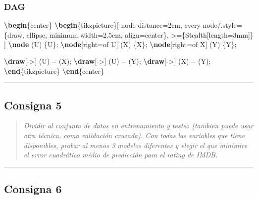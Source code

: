 \documentclass[
]{article}
\newenvironment{Shaded}{\begin{snugshade}}{\end{snugshade}}
\newcommand{\ExtensionTok}[1]{#1}
\newcommand{\FunctionTok}[1]{\textcolor[rgb]{0.13,0.29,0.53}{\textbf{#1}}}
\newcommand{\KeywordTok}[1]{\textcolor[rgb]{0.13,0.29,0.53}{\textbf{#1}}}
\newcommand{\NormalTok}[1]{#1}
\begin{document}
\subsubsection{DAG}\label{dag}

\begin{Shaded}
\begin{Highlighting}[]
\KeywordTok{\textbackslash{}begin}\NormalTok{\{}\ExtensionTok{center}\NormalTok{\}}
\KeywordTok{\textbackslash{}begin}\NormalTok{\{}\ExtensionTok{tikzpicture}\NormalTok{\}[}
\NormalTok{  node distance=2cm,}
\NormalTok{  every node/.style=\{draw, ellipse, minimum width=2.5cm, align=center\},}
\NormalTok{  \textgreater{}=\{Stealth[length=3mm]\}}
\NormalTok{]}
\FunctionTok{\textbackslash{}node}\NormalTok{ (U) \{U\};}
\FunctionTok{\textbackslash{}node}\NormalTok{[right=of U] (X) \{X\};}
\FunctionTok{\textbackslash{}node}\NormalTok{[right=of X] (Y) \{Y\};}

\FunctionTok{\textbackslash{}draw}\NormalTok{[{-}\textgreater{}] (U) {-}{-} (X);}
\FunctionTok{\textbackslash{}draw}\NormalTok{[{-}\textgreater{}] (U) {-}{-} (Y);}
\FunctionTok{\textbackslash{}draw}\NormalTok{[{-}\textgreater{}] (X) {-}{-} (Y);}
\KeywordTok{\textbackslash{}end}\NormalTok{\{}\ExtensionTok{tikzpicture}\NormalTok{\}}
\KeywordTok{\textbackslash{}end}\NormalTok{\{}\ExtensionTok{center}\NormalTok{\}}
\end{Highlighting}
\end{Shaded}

\begin{center}\rule{0.5\linewidth}{0.5pt}\end{center}

\subsection{Consigna 5}\label{consigna-5}

\begin{quote}
\emph{Dividir al conjunto de datos en entrenamiento y testeo (tambien
puede usar otra técnica, como validación cruzada). Con todas las
variables que tiene disponibles, probar al menos 3 modelos diferentes y
elegir el que minimice el error cuadrático médio de predicción para el
rating de IMDB.}
\end{quote}

\begin{center}\rule{0.5\linewidth}{0.5pt}\end{center}

\subsection{Consigna 6}\label{consigna-6}
\end{document}
